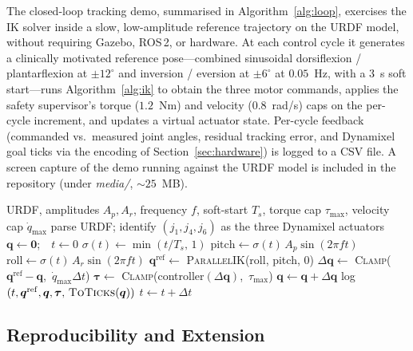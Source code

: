 \documentclass[conference]{IEEEtran}
\begin{document}
The closed-loop tracking demo, summarised in Algorithm~\ref{alg:loop}, exercises the IK solver inside a slow, low-amplitude reference trajectory on the URDF model, without requiring Gazebo, ROS\,2, or hardware. At each control cycle it generates a clinically motivated reference pose---combined sinusoidal dorsiflexion / plantarflexion at $\pm 12^{\circ}$ and inversion / eversion at $\pm 6^{\circ}$ at $0.05$~Hz, with a $3$~s soft start---runs Algorithm~\ref{alg:ik} to obtain the three motor commands, applies the safety supervisor's torque ($1.2$~Nm) and velocity ($0.8$~rad/s) caps on the per-cycle increment, and updates a virtual actuator state. Per-cycle feedback (commanded vs.\ measured joint angles, residual tracking error, and Dynamixel goal ticks via the encoding of Section~\ref{sec:hardware}) is logged to a CSV file. A screen capture of the demo running against the URDF model is included in the repository (under \emph{media/}, $\sim 25$~MB).

\begin{algorithm}[!t]
\caption{Closed-loop ankle-rehab tracking demo}
\label{alg:loop}
\begin{algorithmic}[1]
\REQUIRE URDF, amplitudes $A_p,A_r$, frequency $f$, soft-start $T_s$, torque cap $\tau_{\max}$, velocity cap $\dot{q}_{\max}$
\STATE parse URDF; identify $(j_1,j_4,j_6)$ as the three Dynamixel actuators
\STATE $\boldsymbol{q}\gets\mathbf{0}$;\ \ $t\gets 0$
  \STATE $\sigma(t)\gets\min(t/T_s,\,1)$ \hfill{}
  \STATE $\mathrm{pitch}\gets \sigma(t)\,A_p\sin(2\pi f t)$
  \STATE $\mathrm{roll} \gets \sigma(t)\,A_r\sin(2\pi f t)$
  \STATE $\boldsymbol{q}^{\mathrm{ref}}\gets$ \textsc{ParallelIK}(roll, pitch, $0$)
  \STATE $\Delta\boldsymbol{q}\gets$ \textsc{Clamp}($\boldsymbol{q}^{\mathrm{ref}}-\boldsymbol{q}$,\ $\dot{q}_{\max}\Delta t$)
  \STATE $\boldsymbol{\tau}\gets$ \textsc{Clamp}(controller$(\Delta\boldsymbol{q})$,\ $\tau_{\max}$)
  \STATE $\boldsymbol{q}\gets\boldsymbol{q}+\Delta\boldsymbol{q}$ \hfill{}
  \STATE log $(t,\boldsymbol{q}^{\mathrm{ref}},\boldsymbol{q},\boldsymbol{\tau},\,\textsc{ToTicks}(\boldsymbol{q}))$
  \STATE $t\gets t+\Delta t$
\ENDWHILE
\end{algorithmic}
\end{algorithm}

\subsection{Reproducibility and Extension}
\end{document}
